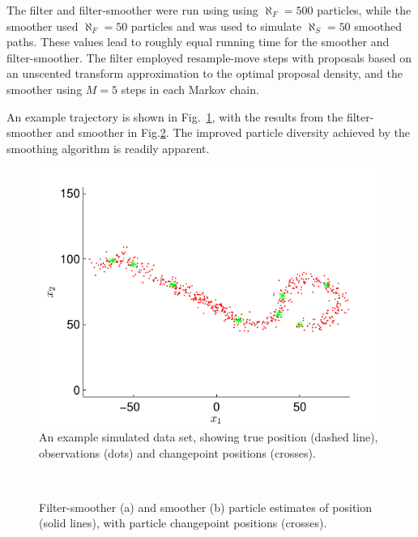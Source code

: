 \documentclass[peerreview,11pt,draftcls,onecolumn]{IEEEtran}
\begin{document}
The filter and filter-smoother were run using using $\aleph_F = 500$ particles, while the smoother used $\aleph_F = 50$ particles and was used to simulate $\aleph_S = 50$ smoothed paths. These values lead to roughly equal running time for the smoother and filter-smoother. The filter employed resample-move steps with proposals based on an unscented transform \cite{Julier2004} approximation to the optimal proposal density, and the smoother using $M=5$ steps in each Markov chain.

An example trajectory is shown in Fig.~\ref{fig:simulated_trajectory}, with the results from the filter-smoother and smoother in Fig.\ref{fig:2D_particle_results}. The improved particle diversity achieved by the smoothing algorithm is readily apparent.
%
\begin{figure}[!t]
\centering
\includegraphics[width=0.45\columnwidth]{simulated_problem.pdf}
\caption{An example simulated data set, showing true position (dashed line), observations (dots) and changepoint positions (crosses). }
\label{fig:simulated_trajectory}
\end{figure}
%
\begin{figure}[!t]
\centering
{} \\
\caption{Filter-smoother (a) and smoother (b) particle estimates of position (solid lines), with particle changepoint positions (crosses). }
\label{fig:2D_particle_results}
\end{figure}
\end{document}
